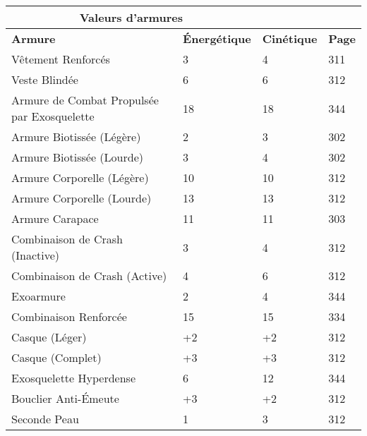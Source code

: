 \begin{table} \begin{tabular}{|l|l|l|l|} \hline

\multicolumn{2}{|c|}{\textbf{Valeurs d'armures}}	\\ \hline

\textbf{Armure}	&\textbf{Énergétique} &\textbf{Cinétique}	&\textbf{Page} \\ \hline

Vêtement Renforcés	&3	&4	&311	\\ \hline

Veste Blindée	&6	&6	&312	\\ \hline

Armure de Combat Propulsée par Exosquelette 	&18	&18	&344	\\ \hline

Armure Biotissée (Légère)	&2	&3	&302	\\ \hline

Armure Biotissée (Lourde)	&3	&4	&302	\\ \hline

Armure Corporelle (Légère)	&10	&10	&312	\\ \hline

Armure Corporelle (Lourde)	&13	&13	&312	\\ \hline

Armure Carapace	&11	&11	&303	\\ \hline

Combinaison de Crash (Inactive)	&3	&4	&312	\\ \hline

Combinaison de Crash (Active)	&4	&6	&312	\\ \hline

Exoarmure	&2	&4	&344	\\ \hline

Combinaison Renforcée	&15	&15	&334	\\ \hline

Casque (Léger)	&+2	&+2	&312	\\ \hline

Casque (Complet)	&+3	&+3	&312	\\ \hline

Exosquelette Hyperdense	&6	&12	&344	\\ \hline

Bouclier Anti-Émeute	&+3	&+2	&312	\\ \hline

Seconde Peau	&1	&3	&312	\\ \hline


\end{tabular}
\end{table}
